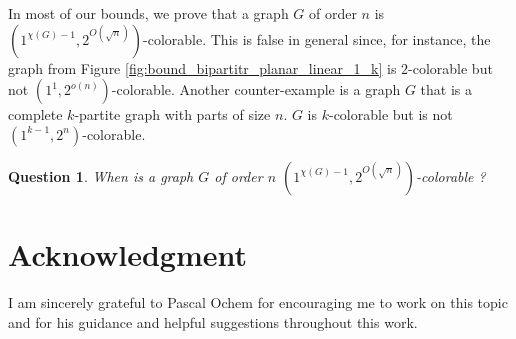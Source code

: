 \documentclass{article}
\newtheorem{question}[theorem]{Question}
\newcommand{\colo}[2]{(1^{#1}, 2^{#2})}
\begin{document}
In most of our bounds, we prove that a graph $G$ of order $n$ is $\colo{\chi(G) - 1}{O(\sqrt{n})}$-colorable. This is false in general since, for instance, the graph from Figure \ref{fig:bound_bipartitr_planar_linear_1_k} is $2$-colorable but not $\colo{1}{o(n)}$-colorable. Another counter-example is a graph $G$ that is a complete $k$-partite graph with parts of size $n$. $G$ is $k$-colorable but is not $\colo{k - 1}{n}$-colorable. 

\begin{question}
    When is a graph $G$ of order $n$ $\colo{\chi(G) - 1}{O(\sqrt{n})}$-colorable ?
\end{question}


\section*{Acknowledgment}
I am sincerely grateful to Pascal Ochem for encouraging me to work on this topic and for his guidance and helpful suggestions throughout this work.



\end{document}
